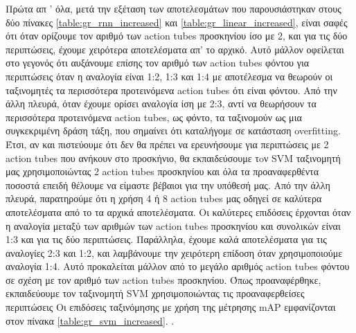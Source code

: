 Πρώτα απ ' όλα, μετά την εξέταση των αποτελεσμάτων που παρουσιάστηκαν στους δύο πίνακες \ref{table:gr_rnn_increased} και \ref{table:gr_linear_increased},
είναι σαφές ότι όταν ορίζουμε τον αριθμό των \en action tubes \gr προσκηνίου ίσο με 2, και για
τις δύο περιπτώσεις, έχουμε χειρότερα αποτελέσματα απ' το αρχικό. Αυτό μάλλον οφείλεται στο γεγονός
ότι αυξάνουμε επίσης τον αριθμό των \en action tubes \gr φόντου για περιπτώσεις όταν η αναλογία είναι 1:2,
1:3 και 1:4 με αποτέλεσμα να θεωρούν οι ταξινομητές τα περισσότερα προτεινόμενα \en action tubes \gr ότι είναι φόντου.
Από την άλλη πλευρά, όταν έχουμε ορίσει αναλογία ίση με 2:3, αντί να θεωρήσουν τα περισσότερα προτεινόμενα \en action tubes, \gr
ως φόντο, τα ταξινομούν ως μια συγκεκριμένη δράση τάξη, που σημαίνει ότι καταλήγομε σε κατάσταση \en overfitting\gr.
Έτσι, αν και πιστεύουμε ότι δεν θα πρέπει να ερευνήσουμε για περιπτώσεις με 2 \en action tubes \gr που ανήκουν στο προσκήνιο,
θα εκπαιδεύσουμε τoν \en SVM  \gr ταξινομητή μας  χρησιμοποιώντας 2 \en action tubes \gr προσκηνίου και όλα τα προαναφερθέντα
ποσοστά επειδή θέλουμε να είμαστε βέβαιοι για την υπόθεσή μας. Από την άλλη πλευρά,
παρατηρούμε ότι η χρήση 4 ή 8 \en action tubes \gr μας οδηγεί σε καλύτερα αποτελέσματα από το
τα αρχικά αποτελέσματα. Οι καλύτερες επιδόσεις έρχονται όταν η αναλογία μεταξύ των αριθμών των \en action tubes \gr  προσκηνίου και συνολικών
 είναι 1:3 και για τις δύο περιπτώσεις. Παράλληλα, έχουμε καλά αποτελέσματα για τις αναλογίες 2:3 και 1:2, και
λαμβάνουμε την χειρότερη επίδοση όταν  χρησιμοποιούμε αναλογία 1:4. Αυτό προκαλείται μάλλον από το μεγάλο
αριθμός \en action tubes \gr φόντου σε σχέση με τον αριθμό των \en action tubes \gr προσκηνίου.
Όπως προαναφέρθηκε, εκπαιδεύουμε τον  ταξινομητή \en  SVM \gr χρησιμοποιώντας τις προαναφερθείσες περιπτώσεις
Οι επιδόσεις ταξινόμησης με χρήση της μέτρησης \en mAP \gr εμφανίζονται στον πίνακα \ref{table:gr_svm_increased}. .

